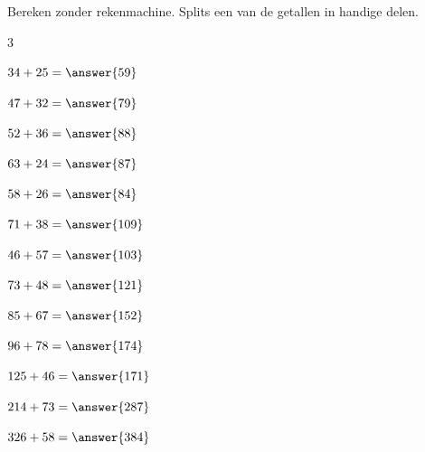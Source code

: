\documentclass{ximera}
\begin{document}
\begin{oefening}{\oefB\ESS}

    Bereken zonder rekenmachine. Splits een van de getallen in handige delen.
    
    \begin{multicols}{3}
    
    \begin{question} \(34+25=\answer{59}\) \end{question}
    
    \begin{question} \(47+32=\answer{79}\) \end{question}
    
    \begin{question} \(52+36=\answer{88}\) \end{question}
    
    \begin{question} \(63+24=\answer{87}\) \end{question}
    
    \begin{question} \(58+26=\answer{84}\) \end{question}
    
    \begin{question} \(71+38=\answer{109}\) \end{question}
    
    \begin{question} \(46+57=\answer{103}\) \end{question}
    
    \begin{question} \(73+48=\answer{121}\) \end{question}
    
    \begin{question} \(85+67=\answer{152}\) \end{question}
    
    \begin{question} \(96+78=\answer{174}\) \end{question}
    
    \begin{question} \(125+46=\answer{171}\) \end{question}
    
    \begin{question} \(214+73=\answer{287}\) \end{question}
    
    \begin{question} \(326+58=\answer{384}\) \end{question}
    

\end{multicols}
\end{oefening}
\end{document}
